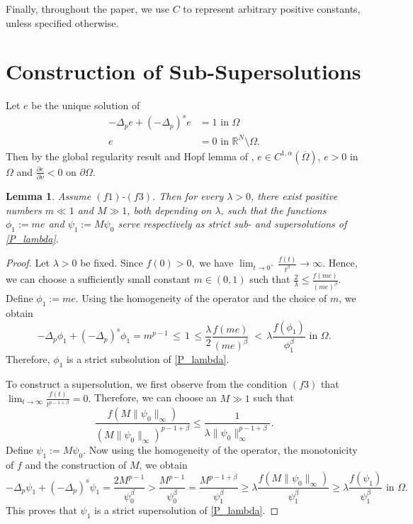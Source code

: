 \documentclass[reqno,oneside]{amsart}
\newtheorem{lemma}[theorem]{Lemma}
\theoremstyle{definition}
\theoremstyle{remark}
\numberwithin{equation}{section}
\newcommand{\p}{\Delta_p}
\newcommand{\ps}{(-\Delta_p)^s}
\newcommand{\la} {\lambda}
\newcommand{\ba}{\beta}
\newcommand{\Om} {\Omega}
\newcommand{\pa}{\partial}
\newcommand{\rar}{\rightarrow}
\newcommand{\omc}{(\overline{\Om})}
\newcommand{\bdry}{\mathbb{R}^N \setminus \Omega}
\begin{document}
Finally, throughout the paper, we use $C$ to represent arbitrary positive constants, unless specified otherwise.


\section{Construction of Sub-Supersolutions}\label{section-construction}

Let $e$ be the unique solution of 
\begin{equation}\label{e}
    \begin{aligned}
        -\p e + \ps e &= 1 \text{ in } \Om\\
        e &= 0 \text{ in } \bdry.
    \end{aligned}
\end{equation}
Then by the global regularity result and Hopf lemma of \cite{antonini2025global}, $e\in C^{1,\alpha} \omc$, $e>0$ in $\Om$ and $\frac{\pa e}{\pa \nu}<0$ on $\pa\Om$.

\begin{lemma}\label{first_pair}
    Assume $(f1)$-$(f3)$. Then for every $\la>0$, there exist positive numbers $m \ll 1$ and $M\gg 1$, both depending on $\la$, such that the functions $\phi_1:= me$ and $\psi_1:= M\psi_0$ serve respectively as strict sub- and supersolutions of \eqref{P_lambda}.
\end{lemma}

\begin{proof}
    Let $\la>0$ be fixed. Since $f(0)>0,$ we have $\lim_{t\rightarrow 0^+}\frac{f(t)}{t^{\ba}} \rar \infty.$ Hence, we can choose a sufficiently small constant $m\in (0,1)$ such that $\frac{2}{\la} \leq \frac{f(me)}{(me)^{\ba}}.$ Define $\phi_1:= me.$ Using the homogeneity of the operator and the choice of $m$, we obtain 
    \begin{equation}\label{sub_soln_1}
        -\p \phi_1 + \ps \phi_1 = m^{p-1} \,\leq \, 1 \,  \leq \frac{\la}{2} \frac{f(me)}{(me)^{\ba}} \; < \, \la \frac{f(\phi_1)}{\phi_1^{\ba}} \text{ in } \Om.
    \end{equation}
    Therefore, $\phi_1$ is a strict subsolution of \eqref{P_lambda}.
    
    To construct a supersolution, we first observe from the condition $(f3)$ that $\lim_{t\rightarrow \infty} \frac{f(t)}{t^{p-1+\beta}}=0.$ Therefore, we can choose an $M\gg 1$ such that
    \[\frac{f\left(M \|\psi_0\|_{\infty} \right)}{\left(M \|\psi_0\|_{\infty} \right)^{p-1+\ba}} \leq \frac{1}{\la \|\psi_0\|_{\infty}^{p-1+\ba}}.\]
    Define $\psi_1:=M \psi_0.$ Now using the homogeneity of the operator, the monotonicity of $f$ and the construction of $M$, we obtain
    \begin{equation*}
        -\p \psi_1 + \ps \psi_1 = \frac{2 M^{p-1}}{\psi_0^{\ba}} > \frac{M^{p-1}}{\psi_0^{\ba}} = \frac{M^{p-1+\ba}}{\psi_1^{\ba}} \geq \la \frac{f\left(M \|\psi_0\|_{\infty}\right)}{\psi_1^{\ba}} \geq \la \frac{f\left(\psi_1\right)}{\psi_1^{\ba}} \text{ in } \Om.
    \end{equation*}
    This proves that $\psi_1$ is a strict supersolution of \eqref{P_lambda}.
\end{proof}
    
\end{document}
